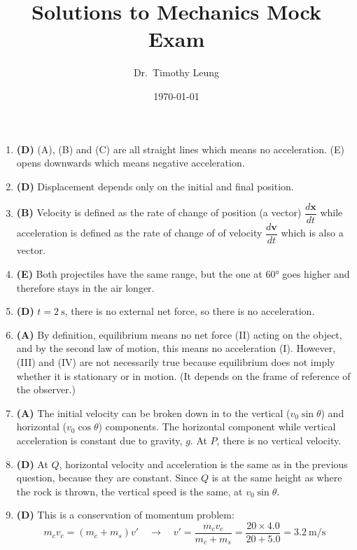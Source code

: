 \documentclass{../../oss-handout}
\title{Solutions to Mechanics Mock Exam}
\author{Dr.\ Timothy Leung}
\date{\today}
\begin{document}
\thispagestyle{title}
\gentitle

\begin{enumerate}[leftmargin=17pt]
\item\textbf{(D)} (A), (B) and (C) are all straight lines which means no
  acceleration. (E) opens downwards which means negative acceleration.

\item\textbf{(D)} Displacement depends only on the initial and final position.

\item\textbf{(B)} Velocity is defined as the rate of change of position (a
  vector) $\dfrac{d\bm{x}}{dt}$ while acceleration is defined as the rate of
  change of of velocity $\dfrac{d\bm{v}}{dt}$ which is also a vector.

\item\textbf{(E)} Both projectiles have the same range, but the one at \ang{60}
  goes higher and therefore stays in the air longer.

\item\textbf{(D)} $t=\SI{2}{\second}$, there is no external net force, so there
  is no acceleration.

\item\textbf{(A)} By definition, equilibrium means no net force (II) acting on
  the object, and by the second law of motion, this means no acceleration (I).
  However, (III) and (IV) are not necessarily true because equilibrium does not
  imply whether it is stationary or in motion. (It depends on the frame of
  reference of the observer.)

\item\textbf{(A)} The initial velocity can be broken down in to the
  vertical ($v_0\sin\theta$) and horizontal ($v_0\cos\theta$) components.
  The horizontal component while vertical acceleration is constant due to
  gravity, $g$. At $P$, there is no vertical velocity.

\item\textbf{(D)} At $Q$, horizontal velocity and acceleration is the same as
  in the previous question, because they are constant. Since $Q$ is at the same
  height as where the rock is thrown, the vertical speed is the same, at
  $v_0\sin\theta$.

\item\textbf{(D)} This is a conservation of momentum problem:
  \begin{equation*}
    m_cv_c=(m_c+m_s)v'\quad\longrightarrow\quad
    v'=\frac{m_cv_c}{m_c+m_s} = \frac{20\times 4.0}{20+5.0}
    =\SI{3.2}{\metre\per\second}
  \end{equation*}


\end{enumerate}
\end{document}
